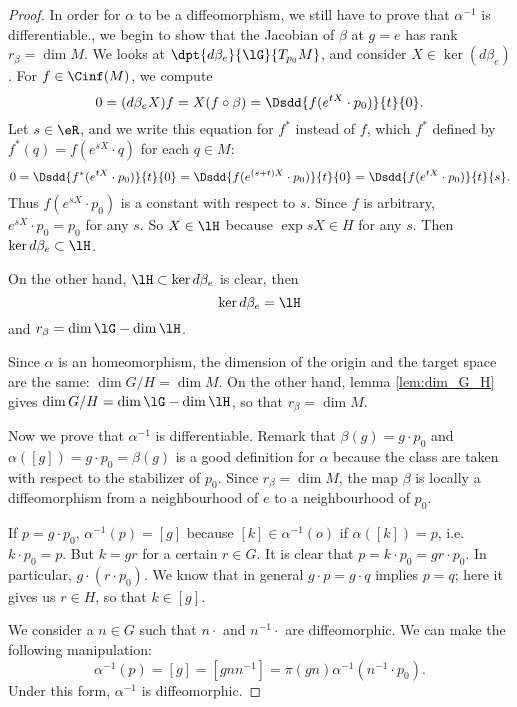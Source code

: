 \begin{proof}
In order for $\alpha$ to be a diffeomorphism, we still have to prove that $\alpha^{-1}$ is differentiable., we begin to show that the Jacobian of $\beta$ at $g=e$ has rank $r_{\beta}=\dim M$. We looks at $\dpt{d\beta_e}{\lG}{T_{p_0}M}$, and consider $X\in\ker (d\beta_e)$. For $f\in\Cinf(M)$, we compute
\begin{equation}
  0=(d\beta_e X)f=X(f\circ\beta)=\Dsdd{ f(e^{tX}\cdot p_0) }{t}{0}.
\end{equation}
Let $s\in\eR$, and we write this equation for $f^*$ instead of $f$, which $f^*$ defined by $f^*(q)=f(e^{sX}\cdot q)$ for each $q\in M$:
\begin{equation}
  0=\Dsdd{f^*(e^{tX}\cdot p_0)}{t}{0}
      =\Dsdd{ f(e^{(s+t)X}\cdot p_0) }{t}{0}
      =\Dsdd{ f(e^{tX}\cdot p_0) }{t}{s}.
\end{equation}
Thus $f(e^{sX}\cdot p_0)$ is a constant with respect to $s$. Since $f$ is arbitrary, $e^{sX}\cdot p_0=p_0$ for any $s$. So $X\in\lH$ because $\exp sX\in H$ for any $s$. Then $\ker d\beta_e\subset \lH$.

On the other hand, $\lH\subset\ker d\beta_e$ is clear, then
\[
   \ker d\beta_e=\lH
\]
and $r_{\beta}=\dim\lG-\dim\lH$.

Since $\alpha$ is an homeomorphism, the dimension of the origin and the target space are the same: $\dim G/H=\dim M$. On the other hand, lemma \ref{lem:dim_G_H} gives $\dim G/H=\dim\lG-\dim\lH$, so that $r_{\beta}=\dim M$.

Now we prove that $\alpha^{-1}$ is differentiable. Remark that $\beta(g)=g\cdot p_0$ and $\alpha([g])=g\cdot p_0=\beta(g)$ is a good definition for $\alpha$ because the class are taken with respect to the stabilizer of $p_0$. Since $r_{\beta}=\dim M$, the map $\beta$ is locally a diffeomorphism from a neighbourhood of $e$ to a neighbourhood of $p_0$.

If $p=g\cdot p_0$, $\alpha^{-1}(p)=[g]$ because $[k]\in\alpha^{-1}(o)$ if $\alpha([k])=p$, i.e. $k\cdot p_0=p$. But $k=gr$ for a certain $r\in G$. It is clear that $p=k\cdot p_0=gr\cdot p_0$. In particular, $g\cdot(r\cdot p_0)$. We know that in general $g\cdot p=g\cdot q$ implies $p=q$; here it gives us $r\in H$, so that $k\in [g]$.

We consider a $n\in G$ such that $n\cdot$ and $n^{-1}\cdot$ are diffeomorphic. We can make the following manipulation:
\begin{equation}
   \alpha^{-1}(p)=[g]
                =[gnn^{-1}]
		=\pi(gn)\alpha^{-1}(n^{-1}\cdot p_0).
\end{equation}
Under this form, $\alpha^{-1}$ is diffeomorphic.



\end{proof}
